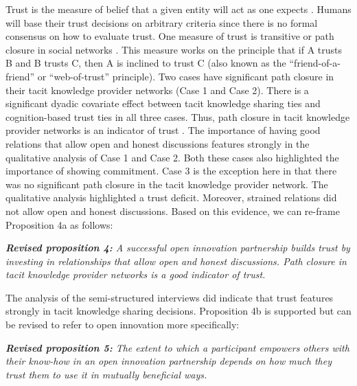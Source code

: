 Trust is the measure of belief that a given entity will act as one expects \citep{richters2011trust}. Humans will base their trust decisions on arbitrary criteria since there is no formal consensus on how to evaluate trust. One measure of trust is transitive or path closure in social networks \citep{coleman1988social,burt2001structural}. This measure works on the principle that if A trusts B and B trusts C, then A is inclined to trust C (also known as the \enquote{friend-of-a-friend} or \enquote{web-of-trust} principle). Two cases have significant path closure in their tacit knowledge provider networks (Case 1 and Case 2). There is a significant dyadic covariate effect between tacit knowledge sharing ties and cognition-based trust ties in all three cases. Thus, path closure in tacit knowledge provider networks is an indicator of trust \citep{sherchan2013survey}. The importance of having good relations that allow open and honest discussions features strongly in the qualitative analysis of Case 1 and Case 2. Both these cases also highlighted the importance of showing commitment. Case 3 is the exception here in that there was no significant path closure in the tacit knowledge provider network. The qualitative analysis highlighted a trust deficit. Moreover, strained relations did not allow open and honest discussions. Based on this evidence, we can re-frame Proposition 4a as follows: \bigskip

\begin{tcolorbox}
\textit{\textbf{Revised proposition 4:} A successful open innovation partnership builds trust by investing in relationships that allow open and honest discussions. Path closure in tacit knowledge provider networks is a good indicator of trust.}
\end{tcolorbox}

The analysis of the semi-structured interviews did indicate that trust features strongly in tacit knowledge sharing decisions. Proposition 4b is supported but can be revised to refer to open innovation more specifically: \bigskip

\begin{tcolorbox}
\textit{\textbf{Revised proposition 5:} The extent to which a participant empowers others with their know-how in an open innovation partnership depends on how much they trust them to use it in mutually beneficial ways.}
\end{tcolorbox}

